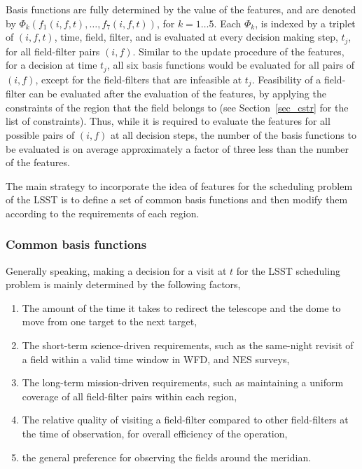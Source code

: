 \documentclass[12pt]{aastex62}
\theoremstyle{definition}
\begin{document}
Basis functions are fully determined by the value of the features, and are denoted by $\Phi_k(f_1(i,f,t),\dots, f_7(i,f,t))$, for $k = 1 \dots 5$. Each $\Phi_k$, is indexed by a triplet of $(i,f,t)$, time, field, filter, and is evaluated at every decision making step, $t_j$, for all field-filter pairs $(i,f)$. Similar to the update procedure of the features, for a decision at time $t_j$, all six basis functions would be evaluated for all pairs of $(i,f)$, except for the field-filters that are infeasible at $t_j$. Feasibility of a field-filter can be evaluated after the evaluation of the features, by applying the constraints of the region that the field belongs to (see Section~\ref{sec_cstr} for the list of constraints). Thus, while it is required to evaluate the features for all possible pairs of $(i,f)$ at all decision steps, the number of the basis functions to be evaluated is on average approximately a factor of three less than the number of the features.

The main strategy to incorporate the idea of features for the scheduling problem of the LSST is to define a  set of common basis functions and then modify them according to the requirements of each region. 


\subsubsection{Common basis functions}

Generally speaking, making a decision for a visit at $t$ for the LSST scheduling problem is mainly determined by the following factors,

\begin{enumerate}
\item The amount of the time it takes to redirect the telescope and the dome to move from one target to the next target,
\item The short-term science-driven requirements, such as the same-night revisit of a field within a valid time window in WFD, and NES surveys,
\item The long-term mission-driven requirements, such as maintaining a uniform coverage of all field-filter pairs within each region,
\item The relative quality of visiting a field-filter compared to other field-filters at the time of observation, for overall efficiency of the operation,
\item the general preference for observing the fields around the meridian.
\end{enumerate}
\end{document}
